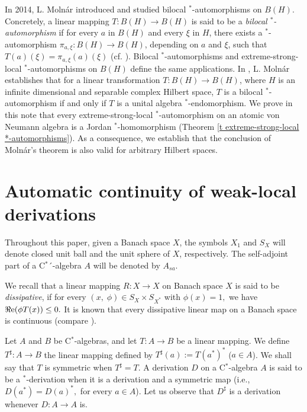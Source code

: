 \documentclass[11pt]{amsart}
\begin{document}
In 2014, L. Moln\'{a}r introduced and studied bilocal $^*$-automorphisms on $B(H)$. Concretely, a linear mapping $T: B(H) \to B(H)$ is said to be a \emph{bilocal $^*$-automorphism} if for every $a$ in $B(H)$ and every $\xi$ in $H$, there exists a $^*$-automorphism $\pi_{a,\xi}: B(H)\to B(H)$, depending on $a$ and $\xi$, such that $T(a) (\xi) = \pi_{a,\xi} (a) (\xi)$ (cf. \cite{Mol2014}). Bilocal $^*$-automorphisms and extreme-strong-local $^*$-automorphisms on  $B(H)$ define the same applications. In \cite[Theorem 1]{Mol2014}, L. Moln\'{a}r establishes that for a linear transformation $T: B(H)\to B(H)$, where $H$ is an infinite dimensional and separable complex Hilbert space, $T$ is a bilocal $^*$-automorphism if and only if $T$ is a unital algebra $^*$-endomorphism. We prove in this note that every extreme-strong-local $^*$-automorphism on an atomic von Neumann algebra is a Jordan $^*$-homomorphism (Theorem \ref{t extreme-strong-local *-automorphisms}). As a consequence, we establish that the conclusion of Molnár's theorem is also valid for arbitrary Hilbert spaces.

\section{Automatic continuity of weak-local derivations}\label{sec: automatic cont}

Throughout this paper, given a Banach space $X$, the symbols $X_1$ and $S_{X}$ will denote closed unit ball and the unit sphere of $X$, respectively. The self-adjoint part of a C$^*$´-algebra $A$ will be denoted by $A_{sa}.$\smallskip

We recall that a linear mapping  $R: X\longrightarrow X$ on Banach space $X$ is said to be \emph{dissipative}, if for every $(x,\;\phi)\in S_X\times S_{X^*}$ with
$\phi(x)=1,$ we have $\Re\hbox{e}(\phi T(x))\leq 0.$ It is known that every dissipative linear map on a Banach space is continuous (compare \cite[Proposition 3.1.15]{BraRo}).\smallskip

Let $A$ and $B$ be C$^*$-algebras, and let $T: A\to B$ be a linear mapping. We define $T^{\sharp} : A\to B$ the linear mapping defined by $T^{\sharp} (a) := T(a^*)^*$ ($a\in A$). We shall say that $T$ is symmetric when $T^{\sharp} = T.$  A derivation $D$ on a C$^*$-algebra $A$ is said to be a $^*$-derivation when it is a derivation and a symmetric map (i.e., $D(a^*) = D(a)^*,$ for every $a\in A$). Let us observe that $D^{\sharp}$ is a derivation whenever $D:A\to A$ is.\smallskip
\end{document}
